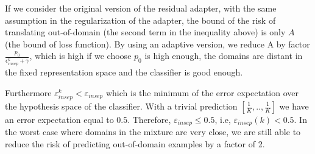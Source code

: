 \documentclass[12pt,times,a4paper,twoside]{article}
\newcommand{\fyTodo}[1]{\Todo[FY:]{\textcolor{orange}{#1}}}
\theoremstyle{definition}
\begin{document}
If we consider the original version of the residual adapter, with the same assumption in the regularization of the adapter, the bound of the risk of translating out-of-domain (the second term in the inequality above) is only $A$ (the bound of loss function). By using an adaptive version, we reduce A by factor $\frac{p_0}{\epsilon^k_{insep}+\gamma}$, which is high if we choose $p_0$ is high enough, the domains are distant in the fixed representation space and the classifier is good enough. 

Furthermore $ \varepsilon^k_{insep} < \varepsilon_{insep} $ which is the minimum of the error expectation over the hypothesis space of the classifier. With a trivial prediction $[\frac{1}{K},..,\frac{1}{K}]$ we have an error expectation equal to $0.5$. Therefore, $\varepsilon_{insep} \leq 0.5$, i.e, $\varepsilon_{insep}(k) < 0.5$.\fyTodo{Je ne comprends pas.} In the worst case where domains in the mixture are very close, we are still able to reduce the risk of predicting out-of-domain examples by a factor of 2.
\fyTodo{I sort of buy the equations but then so what ? We should may be compare with non-adaptive ?}
\end{document}
